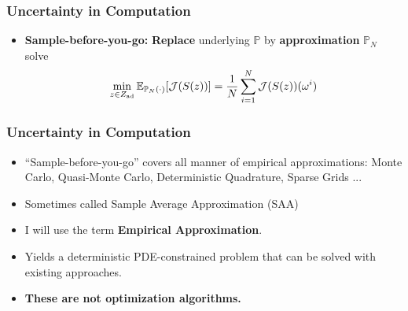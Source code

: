 \documentclass[aspectratio=169,xcolor=dvipsnames,10pt]{beamer}
\newcommand{\risk}{\mathcal{R}}
\begin{document}
\begin{frame}\frametitle{Uncertainty in Computation}
\begin{exampleblock}{}
\begin{itemize}
\item \textbf{Sample-before-you-go:} \textbf{Replace} underlying $\mathbb P$ by  \textbf{approximation} $\mathbb P_N$ solve
\[
\min_{z \in Z_{\rm ad}} \mathbb E_{\mathbb P_N(\cdot)}[\mathcal{J}(S(z))] = \frac{1}{N}\sum_{i=1}^{N} \mathcal{J}(S(z))(\omega^i)
\]
\end{itemize}
\end{exampleblock}
\end{frame}

\begin{frame}\frametitle{Uncertainty in Computation}
\begin{exampleblock}{}
\begin{itemize}
\item ``Sample-before-you-go'' covers all manner of empirical approximations: Monte Carlo, Quasi-Monte Carlo, Deterministic Quadrature, Sparse Grids ... 
\item Sometimes called Sample Average Approximation (SAA)
\item I will use the term \textbf{Empirical Approximation}.
\item Yields a deterministic PDE-constrained problem that can be solved with existing approaches.
\item \textbf{These are not optimization algorithms.}
\end{itemize}
\end{exampleblock}
\end{frame}
\end{document}
